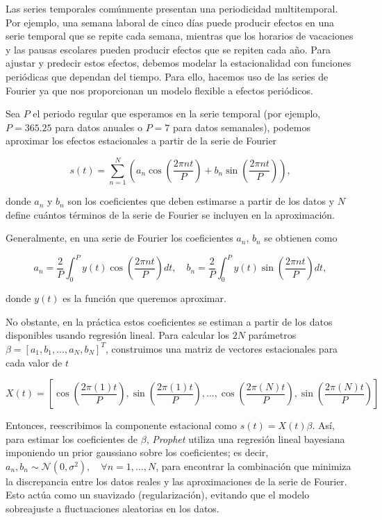 \documentclass[12pt,twoside]{article}
\begin{document}
Las series temporales comúnmente presentan una periodicidad multitemporal. Por ejemplo, una semana laboral de cinco días puede producir efectos en una serie temporal que se repite cada semana, mientras que los horarios de vacaciones y las pausas escolares pueden producir efectos que se repiten cada año. Para ajustar y predecir estos efectos, debemos modelar la estacionalidad con funciones periódicas que dependan del tiempo. Para ello, hacemos uso de las series de Fourier ya que nos proporcionan un modelo flexible a efectos periódicos. 

Sea $P$ el periodo regular que esperamos en la serie temporal (por ejemplo, $P=365.25$ para datos anuales o $P=7$ para datos semanales), podemos aproximar los efectos estacionales a partir de la serie de Fourier 

\begin{equation}
s(t) = \sum_{n=1}^{N} \left( a_n \cos \left(\frac{2\pi n t}{P}\right) + b_n \sin \left( \frac{2\pi n t}{P}\right) \right),
\end{equation}

donde $a_n$ y $b_n$ son los coeficientes que deben estimarse a partir de los datos y $N$ define cuántos términos de la serie de Fourier se incluyen en la aproximación.

Generalmente, en una serie de Fourier los coeficientes $a_n$, $b_n$ se obtienen como

\begin{equation}
a_n = \frac{2}{P} \int_{0}^{P} y(t) \cos \left( \frac{2\pi n t}{P} \right) dt, \quad 
b_n = \frac{2}{P} \int_{0}^{P} y(t) \sin \left( \frac{2\pi n t}{P} \right) dt,
\end{equation}

donde $y(t)$ es la función que queremos aproximar.

No obstante, en la práctica estos coeficientes se estiman a partir de los datos disponibles usando regresión lineal. Para calcular los $2N$ parámetros $\beta = [ a_1, b_1, ..., a_N, b_N]^T$, construimos una matriz de vectores estacionales para cada valor de $t$ 

\begin{equation}
X(t) = \left[\cos \left(\frac{2\pi (1) t}{P}\right), \sin \left(\frac{2\pi (1) t}{P}\right), ..., \cos \left(\frac{2\pi (N) t}{P}\right), \sin \left(\frac{2\pi (N) t}{P}\right) \right]
\end{equation}

Entonces, reescribimos la componente estacional como $s(t) = X(t)\beta$. Así, para estimar los coeficientes de $\beta$, \textit{Prophet} utiliza una regresión lineal bayesiana imponiendo un prior gaussiano sobre los coeficientes; es decir, $a_n, b_n \sim \mathcal{N}(0, \sigma^2), \quad \forall n = 1, \dots, N$, para encontrar la combinación que minimiza la discrepancia entre los datos reales y las aproximaciones de la serie de Fourier. Esto actúa como un suavizado (regularización), evitando que el modelo sobreajuste a fluctuaciones aleatorias en los datos.
\end{document}
